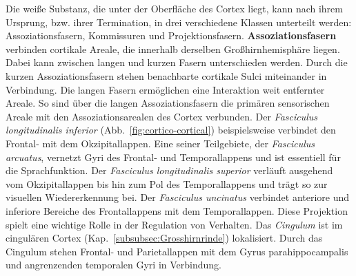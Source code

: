 \documentclass[12pt,a4paper,pdftex]{article}
\begin{document}
Die weiße Substanz, die unter der Oberfläche des Cortex liegt, kann nach ihrem Ursprung, bzw. ihrer Termination, in drei verschiedene Klassen unterteilt werden: Assoziationsfasern, Kommissuren und Projektionsfasern.
\textbf{Assoziationsfasern} verbinden cortikale Areale, die innerhalb derselben Großhirnhemisphäre liegen. Dabei kann zwischen langen und kurzen Fasern unterschieden werden. Durch die kurzen Assoziationsfasern stehen benachbarte cortikale Sulci miteinander in Verbindung. Die langen Fasern ermöglichen eine Interaktion weit entfernter Areale. So sind über die langen Assoziationsfasern die primären sensorischen Areale mit den Assoziationsarealen des Cortex verbunden. Der \textit{Fasciculus longitudinalis inferior} (Abb.~\ref{fig:cortico-cortical}) beispielsweise verbindet den Frontal- mit dem Okzipitallappen. Eine seiner Teilgebiete, der \textit{Fasciculus arcuatus}, vernetzt Gyri des Frontal- und Temporallappens und ist essentiell für die Sprachfunktion. Der \textit{Fasciculus longitudinalis superior} verläuft ausgehend vom Okzipitallappen bis hin zum Pol des Temporallappens und trägt so zur visuellen Wiedererkennung bei. Der \textit{Fasciculus uncinatus} verbindet anteriore und inferiore Bereiche des Frontallappens mit dem Temporallappen. Diese Projektion spielt eine wichtige Rolle in der Regulation von Verhalten. Das \textit{Cingulum} ist im cingulären Cortex (Kap.~\ref{subsubsec:Grosshirnrinde}) lokalisiert. Durch das Cingulum stehen Frontal- und Parietallappen mit dem Gyrus parahippocampalis und angrenzenden temporalen Gyri in Verbindung.
\end{document}
